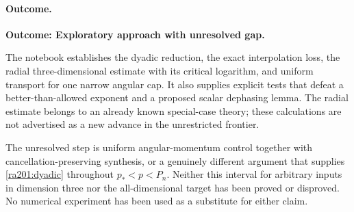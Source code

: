 \documentclass[11pt]{article}
\begin{document}
	\paragraph{Outcome.}
	\textbf{Outcome: Exploratory approach with unresolved gap.}
	
	The notebook establishes the dyadic reduction, the exact interpolation
	loss, the radial three-dimensional estimate with its critical logarithm,
	and uniform transport for one narrow angular cap. It also supplies
	explicit tests that defeat a better-than-allowed exponent and a proposed
	scalar dephasing lemma. The radial estimate belongs to an already known
	special-case theory; these calculations are not advertised as a new
	advance in the unrestricted frontier.
	
	The unresolved step is uniform angular-momentum control together with
	cancellation-preserving synthesis, or a genuinely different argument
	that supplies \eqref{ra201:dyadic} throughout
	$p_*<p<P_n$. Neither this interval for arbitrary inputs in dimension
	three nor the all-dimensional target has been proved or disproved.
	No numerical experiment has been used as a substitute for either claim.
\end{document}
